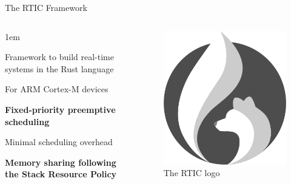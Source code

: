 \begin{frame}{The RTIC Framework}
    \begin{columns}
        \begin{itemize-size}{1em}
            \item Framework to build real-time systems in the Rust language
            \item For ARM Cortex-M devices
            \item \textbf{\textcolor{green!70}{Fixed-priority preemptive scheduling}}
            \item Minimal scheduling overhead
            \item \textbf{\textcolor{green!70}{Memory sharing following the
                Stack Resource Policy}}
        \end{itemize-size}

        \begin{figure}
            \centering
            \includegraphics[scale=0.35]{pictures/RTIC.png}
            \caption{The RTIC logo}
        \end{figure}
    \end{columns}
\end{frame}


